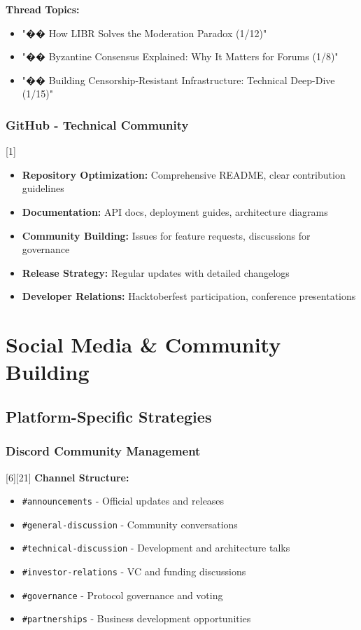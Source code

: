 \documentclass[12pt,a4paper]{article}
\begin{document}
\textbf{Thread Topics:}
\begin{itemize}
    \item "�� How LIBR Solves the Moderation Paradox (1/12)"
    \item "�� Byzantine Consensus Explained: Why It Matters for Forums (1/8)"  
    \item "�� Building Censorship-Resistant Infrastructure: Technical Deep-Dive (1/15)"
\end{itemize}

\subsubsection{GitHub - Technical Community}[1]
\begin{itemize}
    \item \textbf{Repository Optimization:} Comprehensive README, clear contribution guidelines
    \item \textbf{Documentation:} API docs, deployment guides, architecture diagrams
    \item \textbf{Community Building:} Issues for feature requests, discussions for governance
    \item \textbf{Release Strategy:} Regular updates with detailed changelogs
    \item \textbf{Developer Relations:} Hacktoberfest participation, conference presentations
\end{itemize}

\section{Social Media \& Community Building}

\subsection{Platform-Specific Strategies}

\subsubsection{Discord Community Management}[6][21]
\textbf{Channel Structure:}
\begin{itemize}
    \item \texttt{\#announcements} - Official updates and releases
    \item \texttt{\#general-discussion} - Community conversations
    \item \texttt{\#technical-discussion} - Development and architecture talks
    \item \texttt{\#investor-relations} - VC and funding discussions
    \item \texttt{\#governance} - Protocol governance and voting
    \item \texttt{\#partnerships} - Business development opportunities
\end{itemize}
\end{document}
